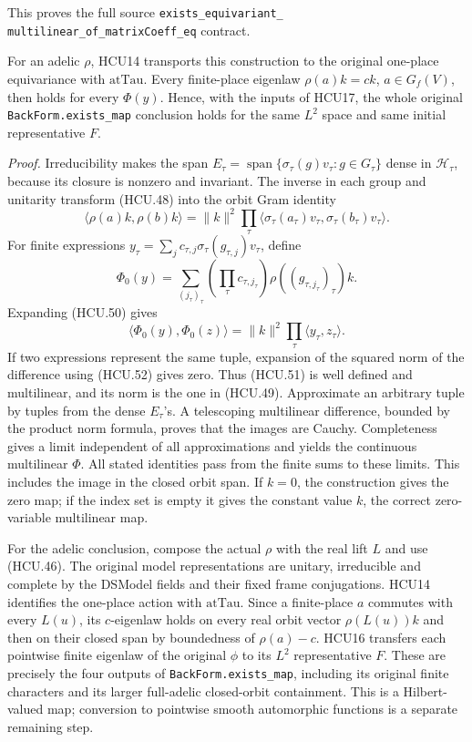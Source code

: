 This proves the full source
\texttt{exists\_equivariant\_}\allowbreak
\texttt{multilinear\_of\_}\allowbreak\texttt{matrixCoeff\_eq}
contract.

For an adelic \(\rho\), HCU14 transports this construction to the
original one-place equivariance with \(\mathrm{atTau}\).
Every finite-place eigenlaw \(\rho(a)k=c k\), \(a\in G_f(V)\),
then holds for every \(\Phi(y)\).  Hence, with the inputs of HCU17,
the whole original \texttt{BackForm.exists\_map} conclusion holds
for the same \(L^2\) space and same initial representative \(F\).

\emph{Proof.}
Irreducibility makes the span
\(E_\tau=\operatorname{span}\{\sigma_\tau(g)v_\tau:g\in G_\tau\}\)
dense in \(\mathcal H_\tau\), because its closure is nonzero and
invariant.  The inverse in each group and unitarity transform
(HCU.48) into the orbit Gram identity
\[
 \langle \rho(a)k,\rho(b)k\rangle
   =\|k\|^2\prod_\tau
       \langle\sigma_\tau(a_\tau)v_\tau,
              \sigma_\tau(b_\tau)v_\tau\rangle .
 \tag{HCU.50}
\]
For finite expressions
\(y_\tau=\sum_j c_{\tau,j}\sigma_\tau(g_{\tau,j})v_\tau\),
define
\[
 \Phi_0(y)=
  \sum_{(j_\tau)_\tau}
       \left(\prod_\tau c_{\tau,j_\tau}\right)
       \rho((g_{\tau,j_\tau})_\tau)k .
 \tag{HCU.51}
\]
Expanding (HCU.50) gives
\[
 \langle\Phi_0(y),\Phi_0(z)\rangle
       =\|k\|^2\prod_\tau\langle y_\tau,z_\tau\rangle .
 \tag{HCU.52}
\]
If two expressions represent the same tuple, expansion of the squared
norm of the difference using (HCU.52) gives zero.  Thus (HCU.51)
is well defined and multilinear, and its norm is the one in
(HCU.49).  Approximate an arbitrary tuple by tuples from the dense
\(E_\tau\)'s.  A telescoping multilinear difference, bounded by the
product norm formula, proves that the images are Cauchy.
Completeness gives a limit independent of all approximations and
yields the continuous multilinear \(\Phi\).
All stated identities pass from the finite sums to these limits.
This includes the image in the closed orbit span.  If \(k=0\), the
construction gives the zero map; if the index set is empty it gives
the constant value \(k\), the correct zero-variable multilinear map.

For the adelic conclusion, compose the actual \(\rho\) with the
real lift \(L\) and use (HCU.46).
The original model representations are unitary, irreducible and
complete by the DSModel fields and their fixed frame conjugations.
HCU14 identifies the one-place action with \(\mathrm{atTau}\).
Since a finite-place \(a\) commutes with every \(L(u)\), its
\(c\)-eigenlaw holds on every real orbit vector \(\rho(L(u))k\)
and then on their closed span by boundedness of \(\rho(a)-c\).
HCU16 transfers each pointwise finite eigenlaw of the original
\(\phi\) to its \(L^2\) representative \(F\).
These are precisely the four outputs of
\texttt{BackForm.exists\_map}, including its original finite
characters and its larger full-adelic closed-orbit containment.
This is a Hilbert-valued map; conversion to pointwise smooth
automorphic functions is a separate remaining step.

